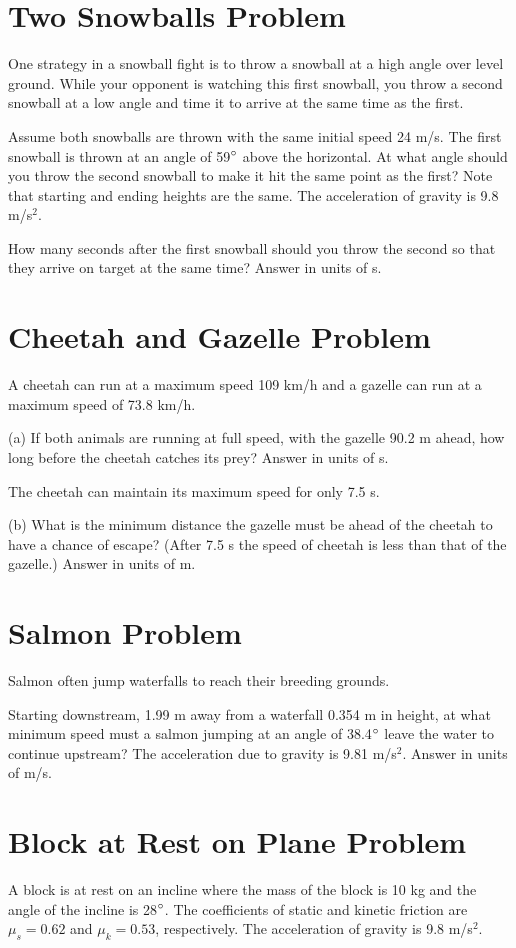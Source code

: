\documentclass[../physics12.tex]{subfiles}
\begin{document}
\section{Two Snowballs Problem}
One strategy in a snowball fight is to throw a snowball at a high angle over level ground. While your opponent is watching this first snowball, you throw a second snowball at a low angle and time it to arrive at the same time as the first.

Assume both snowballs are thrown with the same initial speed 24 m/s. The first snowball is thrown at an angle of 59$\degree$ above the horizontal. At what angle should you throw the second snowball to make it hit the same point as the first? 
Note that starting and ending heights are the same. The acceleration of gravity is 9.8 m/s$^2$.

How many seconds after the first snowball should you throw the second so that they arrive on target at the same time?
Answer in units of s.

\section{Cheetah and Gazelle Problem}
A cheetah can run at a maximum speed 109 km/h and a gazelle can run at a maximum speed of 73.8 km/h.

(a) If both animals are running at full speed, with the gazelle 90.2 m ahead, how long before the cheetah catches its prey?
Answer in units of s.

The cheetah can maintain its maximum speed for only 7.5 s.

(b) What is the minimum distance the gazelle must be ahead of the cheetah to have a chance of escape? (After 7.5 s the speed of cheetah is less than that of the gazelle.)
Answer in units of m.

\section{Salmon Problem}
Salmon often jump waterfalls to reach their breeding grounds.

Starting downstream, 1.99 m away from a waterfall 0.354 m in height, at what minimum speed must a salmon jumping at an angle of 38.4$\degree$ leave the water to continue upstream?
The acceleration due to gravity is 9.81 m/s$^2$.
Answer in units of m/s.

\section{Block at Rest on Plane Problem}
A block is at rest on an incline where the mass of the block is 10 kg and the angle of the incline is 28$\degree$. The coefficients of static and kinetic friction are $\mu_s = 0.62$ and $\mu_k = 0.53$, respectively.
The acceleration of gravity is 9.8 m/s$^2$.
\end{document}
